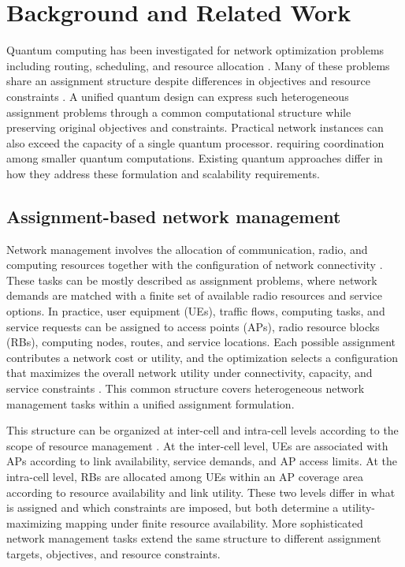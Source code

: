 \documentclass[journal]{IEEEtran}
\begin{document}
{%
\section{Background and Related Work}
\label{sec:background}

Quantum computing has been investigated for network optimization problems including routing, scheduling, and resource allocation \cite{17,20,21,22}. Many of these problems share an assignment structure despite differences in objectives and resource constraints \cite{5,6}. 
A unified quantum design can express such heterogeneous assignment problems through a common computational structure while preserving original objectives and constraints. Practical network instances can also exceed the capacity of a single quantum processor. requiring coordination among smaller quantum
computations. Existing quantum approaches differ in how they address these formulation and scalability requirements.

\subsection{Assignment-based network management}
\label{sec:bg-assignment}

Network management involves the allocation of communication, radio, and computing resources together with the configuration of network connectivity \cite{5,6}. These tasks can be mostly described as assignment problems, where network demands are matched with a finite set of available radio resources and service options. In practice, user equipment (UEs), traffic flows, computing tasks, and service requests can be assigned to access points (APs), radio resource blocks (RBs), computing nodes, routes, and service locations. Each possible assignment contributes a network cost or utility, and the optimization selects a configuration that maximizes the overall network utility under connectivity, capacity, and service constraints \cite{5,6,24}. This common structure covers heterogeneous network management tasks within a unified assignment formulation.

This structure can be organized at inter-cell and intra-cell levels according to the scope of resource management \cite{24}. At the inter-cell level, UEs are associated with APs according to link availability, service demands, and AP access limits. At the intra-cell level, RBs are allocated among UEs within an AP coverage area according to resource availability and link utility. These two levels differ in what is assigned and which constraints are imposed, but both determine a utility-maximizing mapping under finite resource availability. More sophisticated network management tasks extend the same structure to different assignment targets, objectives, and resource constraints.

}
\end{document}
